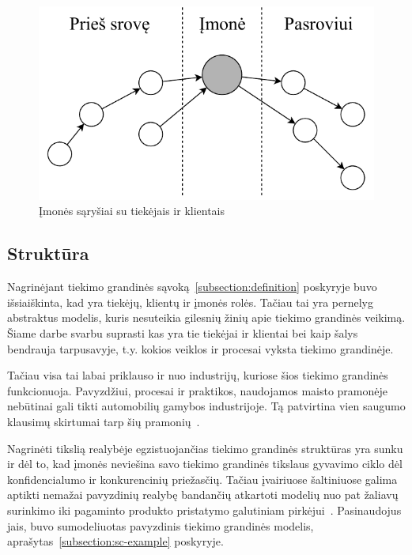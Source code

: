 \begin{figure}[H]
    \centering
    \includegraphics[scale=0.8]{images/supply-chain-upstream-downstream}
    \caption{Įmonės sąryšiai su tiekėjais ir klientais~\cite{christopher2016logistics}}
    \label{img:3}
\end{figure}




\subsection{Struktūra} \label{subsection:structure}

Nagrinėjant tiekimo grandinės sąvoką~\ref{subsection:definition} poskyryje buvo išsiaiškinta, kad yra tiekėjų, klientų ir įmonės rolės. Tačiau tai yra pernelyg abstraktus modelis, kuris nesuteikia gilesnių žinių apie tiekimo grandinės veikimą. Šiame darbe svarbu suprasti kas yra tie tiekėjai ir klientai bei kaip šalys bendrauja tarpusavyje, t.y. kokios veiklos ir procesai vyksta tiekimo grandinėje. 

Tačiau visa tai labai priklauso ir nuo industrijų, kuriose šios tiekimo grandinės funkcionuoja. Pavyzdžiui, procesai ir praktikos, naudojamos maisto pramonėje nebūtinai gali tikti automobilių gamybos industrijoje. Tą patvirtina vien saugumo klausimų skirtumai tarp šių pramonių~\cite{marucheck2011product}.

Nagrinėti tikslią realybėje egzistuojančias tiekimo grandinės struktūras yra sunku ir dėl to, kad įmonės neviešina savo tiekimo grandinės tikslaus gyvavimo ciklo dėl konfidencialumo ir konkurencinių priežasčių. Tačiau įvairiuose šaltiniuose galima aptikti nemažai pavyzdinių realybę bandančių atkartoti modelių nuo pat žaliavų surinkimo iki pagaminto produkto pristatymo galutiniam pirkėjui~\cite{christopher2016logistics, webber2009building, patrick2017continuous, justin2016customer}. Pasinaudojus jais, buvo sumodeliuotas pavyzdinis tiekimo grandinės modelis, aprašytas~\ref{subsection:sc-example} poskyryje.

